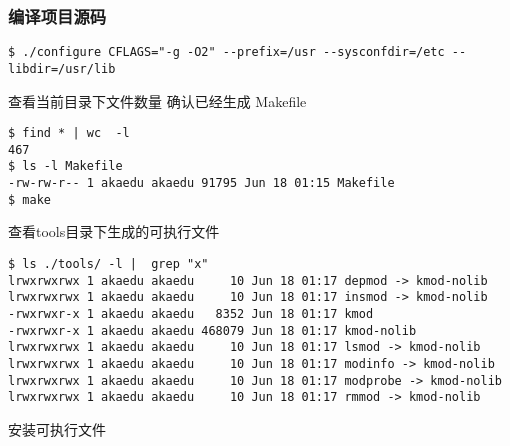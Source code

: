 \documentclass[11pt,a4paper]{article}
\begin{document}
\subsubsection{编译项目源码}

{\begin{shaded}\begin{verbatim}
$ ./configure CFLAGS="-g -O2" --prefix=/usr --sysconfdir=/etc --libdir=/usr/lib
\end{verbatim}\end{shaded}}
查看当前目录下文件数量 确认已经生成 Makefile

{\begin{shaded}\begin{verbatim}
$ find * | wc  -l
467
$ ls -l Makefile
-rw-rw-r-- 1 akaedu akaedu 91795 Jun 18 01:15 Makefile
$ make
\end{verbatim}\end{shaded}}
查看tools目录下生成的可执行文件

{\begin{shaded}\begin{verbatim}
$ ls ./tools/ -l |  grep "x"
lrwxrwxrwx 1 akaedu akaedu     10 Jun 18 01:17 depmod -> kmod-nolib
lrwxrwxrwx 1 akaedu akaedu     10 Jun 18 01:17 insmod -> kmod-nolib
-rwxrwxr-x 1 akaedu akaedu   8352 Jun 18 01:17 kmod
-rwxrwxr-x 1 akaedu akaedu 468079 Jun 18 01:17 kmod-nolib
lrwxrwxrwx 1 akaedu akaedu     10 Jun 18 01:17 lsmod -> kmod-nolib
lrwxrwxrwx 1 akaedu akaedu     10 Jun 18 01:17 modinfo -> kmod-nolib
lrwxrwxrwx 1 akaedu akaedu     10 Jun 18 01:17 modprobe -> kmod-nolib
lrwxrwxrwx 1 akaedu akaedu     10 Jun 18 01:17 rmmod -> kmod-nolib
\end{verbatim}\end{shaded}}
安装可执行文件
\end{document}
